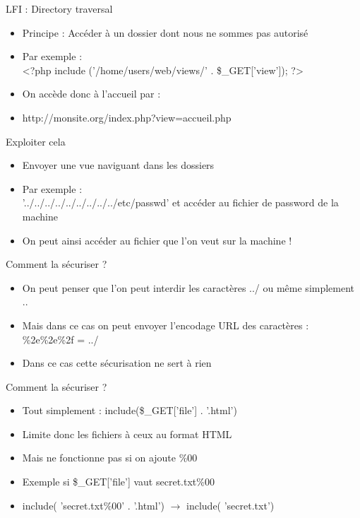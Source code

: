 \documentclass{beamer}
\begin{document}
\begin{frame}{LFI : Directory traversal}
	\begin{itemize}
		\item Principe : Accéder à un dossier dont nous ne sommes pas autorisé
		\item Par exemple : \\
		<?php include ('/home/users/web/views/' . \$\_GET['view']); ?>
		\item On accède donc à l'accueil par : 
		\item http://monsite.org/index.php?view=accueil.php
	\end{itemize}
\end{frame}

\begin{frame}{Exploiter cela}
	\begin{itemize}
		\item Envoyer une vue naviguant dans les dossiers
		\item Par exemple : \\
		'../../../../../../../../../etc/passwd' et accéder au fichier de password de la machine
		\item On peut ainsi accéder au fichier que l'on veut sur la machine !
	\end{itemize}
\end{frame}

\begin{frame}{Comment la sécuriser ?}
	\begin{itemize}
		\item On peut penser que l'on peut interdir les caractères ../ ou même simplement ..
		\item Mais dans ce cas on peut envoyer l'encodage URL des caractères : \%2e\%2e\%2f = ../
		\item Dans ce cas cette sécurisation ne sert à rien
	\end{itemize}
\end{frame}

\begin{frame}{Comment la sécuriser ?}
	\begin{itemize}
		\item<1-> Tout simplement : include(\$\_GET['file'] . '.html')
		\item<1-> Limite donc les fichiers à ceux au format HTML
		\item<2-> Mais ne fonctionne pas si on ajoute \%00
		\item<2-> Exemple si \$\_GET['file'] vaut secret.txt\%00 
		\item<2-> include( 'secret.txt\%00' . '.html') $\rightarrow$ include( 'secret.txt')
	\end{itemize}
\end{frame}
\end{document}
